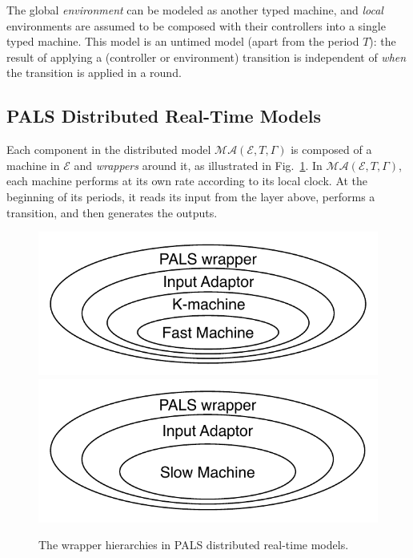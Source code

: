 
The global \emph{environment} can be modeled as another typed
machine, and \emph{local} environments are assumed to be composed with their
controllers into a single typed machine. 
This model is an untimed model (apart from the period $T$): 
the result of applying a (controller or environment) transition is 
independent of \emph{when}  the transition is applied in a round. 

\subsection{PALS Distributed  Real-Time Models}
\label{pals-dist}

Each component in the  distributed model $\mathcal{MA}(\mathcal{E}, T, \Gamma)$
is composed of a machine in $\mathcal{E}$ and \emph{wrappers} around it, as illustrated in Fig.~\ref{fig:wrappers}.
In $\mathcal{MA}(\mathcal{E}, T, \Gamma)$,
each machine performs at its own rate according to its local clock.
At the beginning of its periods, it reads its input from the layer above, 
performs a transition, and then generates the outputs.

\begin{figure}
\centering
\includegraphics[width=0.49\columnwidth,clip=true,trim=0.3cm 0.3cm 0.3cm 0.3cm]{Onion-f.pdf}
\hfill
\includegraphics[width=0.49\columnwidth,clip=true,trim=0.3cm 0.3cm 0.3cm 0.3cm]{Onion-s.pdf}
\caption{The wrapper hierarchies %
in PALS distributed real-time  models.}
\label{fig:wrappers}
\end{figure}


